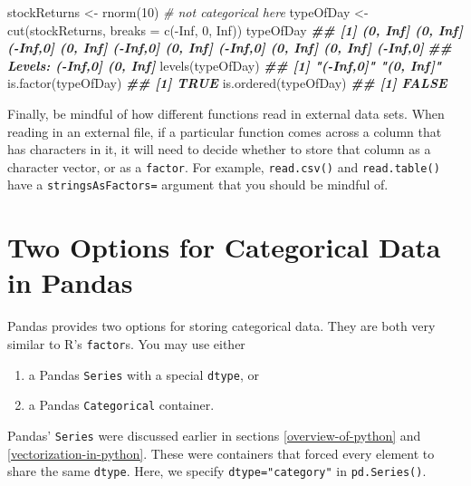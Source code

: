 \documentclass[
  12pt,
]{krantz}
\makeatletter
\newenvironment{Shaded}{\begin{snugshade}}{\end{snugshade}}
\newcommand{\AttributeTok}[1]{\textcolor[rgb]{0.61,0.61,0.61}{#1}}
\newcommand{\CommentTok}[1]{\textcolor[rgb]{0.37,0.37,0.37}{\textit{#1}}}
\newcommand{\ConstantTok}[1]{\textcolor[rgb]{0,0,0}{#1}}
\newcommand{\DecValTok}[1]{\textcolor[rgb]{0.06,0.06,0.06}{#1}}
\newcommand{\DocumentationTok}[1]{\textcolor[rgb]{0.37,0.37,0.37}{\textbf{\textit{#1}}}}
\newcommand{\FunctionTok}[1]{\textcolor[rgb]{0,0,0}{#1}}
\newcommand{\NormalTok}[1]{#1}
\newcommand{\OtherTok}[1]{\textcolor[rgb]{0.37,0.37,0.37}{#1}}
\newcommand{\SpecialCharTok}[1]{\textcolor[rgb]{0,0,0}{#1}}
\providecommand{\tightlist}{%
  \setlength{\itemsep}{0pt}\setlength{\parskip}{0pt}}
\newenvironment{kframe}{%
\medskip{}
\setlength{\fboxsep}{.8em}
 \def\at@end@of@kframe{}%
 \ifinner\ifhmode%
  \def\at@end@of@kframe{\end{minipage}}%
  \begin{minipage}{\columnwidth}%
 \fi\fi%
 \def\FrameCommand##1{\hskip\@totalleftmargin \hskip-\fboxsep
 \colorbox{shadecolor}{##1}\hskip-\fboxsep
     \hskip-\linewidth \hskip-\@totalleftmargin \hskip\columnwidth}%
 \MakeFramed {\advance\hsize-\width
   \@totalleftmargin\z@ \linewidth\hsize
   \@setminipage}}%
 {\par\unskip\endMakeFramed%
 \at@end@of@kframe}
\renewenvironment{Shaded}{\begin{kframe}}{\end{kframe}}
\makeatother
\begin{document}
\begin{Shaded}
\begin{Highlighting}[]
\NormalTok{stockReturns }\OtherTok{\textless{}{-}} \FunctionTok{rnorm}\NormalTok{(}\DecValTok{10}\NormalTok{) }\CommentTok{\# not categorical here}
\NormalTok{typeOfDay }\OtherTok{\textless{}{-}} \FunctionTok{cut}\NormalTok{(stockReturns, }\AttributeTok{breaks =} \FunctionTok{c}\NormalTok{(}\SpecialCharTok{{-}}\ConstantTok{Inf}\NormalTok{, }\DecValTok{0}\NormalTok{, }\ConstantTok{Inf}\NormalTok{)) }
\NormalTok{typeOfDay}
\DocumentationTok{\#\#  [1] (0, Inf] (0, Inf] ({-}Inf,0] (0, Inf] ({-}Inf,0] (0, Inf] ({-}Inf,0] (0, Inf] (0, Inf] ({-}Inf,0]}
\DocumentationTok{\#\# Levels: ({-}Inf,0] (0, Inf]}
\FunctionTok{levels}\NormalTok{(typeOfDay)}
\DocumentationTok{\#\# [1] "({-}Inf,0]" "(0, Inf]"}
\FunctionTok{is.factor}\NormalTok{(typeOfDay)}
\DocumentationTok{\#\# [1] TRUE}
\FunctionTok{is.ordered}\NormalTok{(typeOfDay)}
\DocumentationTok{\#\# [1] FALSE}
\end{Highlighting}
\end{Shaded}

Finally, be mindful of how different functions read in external data sets. When reading in an external file, if a particular function comes across a column that has characters in it, it will need to decide whether to store that column as a character vector, or as a \texttt{factor}. For example, \texttt{read.csv()} and \texttt{read.table()} have a \texttt{stringsAsFactors=} argument that you should be mindful of.

\hypertarget{two-options-for-categorical-data-in-pandas}{%
\section{Two Options for Categorical Data in Pandas}\label{two-options-for-categorical-data-in-pandas}}

Pandas provides two options for storing categorical data. They are both very similar to R's \texttt{factor}s. You may use either

\begin{enumerate}
\def\labelenumi{\arabic{enumi}.}
\tightlist
\item
  a Pandas \texttt{Series} with a special \texttt{dtype}, or
\item
  a Pandas \texttt{Categorical} container.
\end{enumerate}

Pandas' \texttt{Series} were discussed earlier in sections \ref{overview-of-python} and \ref{vectorization-in-python}. These were containers that forced every element to share the same \texttt{dtype}. Here, we specify \texttt{dtype="category"} in \texttt{pd.Series()}.
\end{document}
